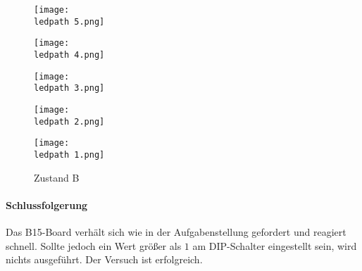 \begin{figure}
\begin{minipage}[c]{\ledspacing}
	\texttt{[image: \\ledpath 5.png]}
	\end{minipage}
	\hfill
	\begin{minipage}[c]{\ledspacing}
	\texttt{[image: \\ledpath 4.png]}
	\end{minipage}
	\hfill
	\begin{minipage}[c]{\ledspacing}
	\texttt{[image: \\ledpath 3.png]}
	\end{minipage}
	\hfill
	\begin{minipage}[c]{\ledspacing}
	\texttt{[image: \\ledpath 2.png]}
	\end{minipage}
	\hfill
	\begin{minipage}[c]{\ledspacing}
	\texttt{[image: \\ledpath 1.png]}
	\end{minipage}
	
	\caption{Zustand B}
\end{figure}

\paragraph{Schlussfolgerung}
Das B15-Board verhält sich wie in der Aufgabenstellung gefordert und reagiert schnell. Sollte jedoch ein Wert größer als $1$ am DIP-Schalter eingestellt sein, wird nichts ausgeführt. Der Versuch ist erfolgreich.
\\\\
\inputminted[linenos=true, breaklines, fontsize=\fontsize{10pt}{10pt}]{cpp}{../task10/main.cpp}